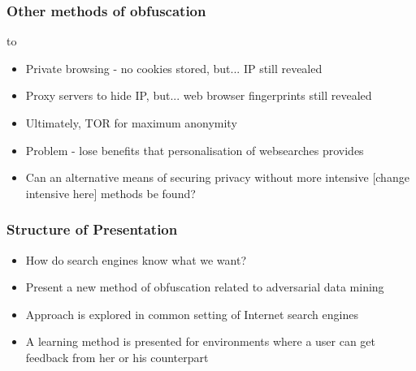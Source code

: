 \documentclass{beamer}
\begin{document}

\begin{frame}
\frametitle{Other methods of obfuscation}
\begin{minipage}{0.4\textwidth}
	\vbox to 
\end{minipage}\hfill
\begin{minipage}{0.6\textwidth}
\begin{itemize}
	\item Private browsing - no cookies stored, but... IP still revealed
	\item Proxy servers to hide IP, but... web browser fingerprints still revealed
	\item Ultimately, TOR for maximum anonymity
	\item Problem - lose benefits that personalisation of websearches provides
	\item Can an alternative means of securing privacy without more intensive [change intensive here] methods be found?
\end{itemize}
\end{minipage}
\end{frame}

\begin{frame}
\frametitle{Structure of Presentation}
\begin{itemize} %
	\item How do search engines know what we want?
	\item Present a new method of obfuscation related to adversarial data mining
	\item Approach is explored in common setting of Internet search engines
	\item A learning method is presented for environments where a user can get feedback from her or his counterpart
\end{itemize}
\end{frame}
\end{document}
